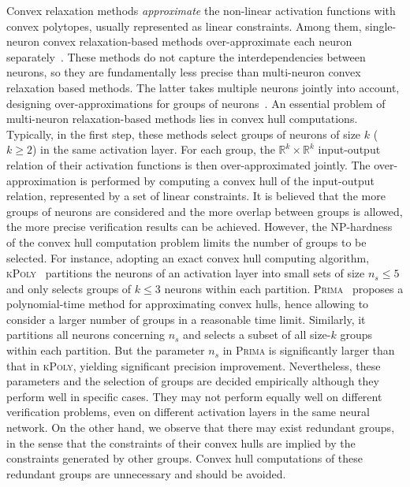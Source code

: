 \documentclass[runningheads]{llncs}
\newcommand{\prima}{\textsc{Prima}\xspace}
\newcommand{\krelu}{\textsc{kPoly}\xspace}
\newcommand{\real}{\mathbb{R}}
\begin{document}
Convex relaxation methods \emph{approximate} the non-linear activation functions
with convex polytopes, usually represented as linear constraints.
Among them, single-neuron convex relaxation-based methods over-approximate
each neuron separately~\cite{NEURIPS2018_f2f44698,DBLP:journals/pacmpl/SinghGPV19,DBLP:conf/nips/ZhangWCHD18,DBLP:conf/iclr/XuZ0WJLH21,Zheng2022}.
These methods do not capture the interdependencies between neurons,
so they are fundamentally less precise than multi-neuron convex relaxation
based methods.
The latter takes multiple neurons jointly into account,
designing over-approximations for groups of neurons~\cite{DBLP:conf/nips/SinghGPV19,DBLP:conf/nips/TjandraatmadjaA20,DBLP:journals/pacmpl/MullerMSPV22}.
An essential problem of multi-neuron relaxation-based methods lies in
convex hull computations. Typically, in the first step, these
methods select groups of neurons of size $k$ ($k\ge 2$) in the same
activation layer. For each group, the $\real^k\times \real^k$
input-output relation of their activation functions is then
over-approximated jointly. The over-approximation is performed by
computing a convex hull of the input-output relation, represented by a
set of linear constraints. It is believed that the more groups of
neurons are considered and the more overlap between groups is allowed,
the more precise verification results can be achieved. However, the
NP-hardness of the convex hull computation problem limits the number of
groups to be selected. For instance, adopting an exact convex hull
computing algorithm, \krelu~\cite{DBLP:conf/nips/SinghGPV19}
partitions the neurons of an activation layer into small sets of size
$n_s \le 5$ and only selects groups of $k\le 3$ neurons within each
partition. \prima~\cite{DBLP:journals/pacmpl/MullerMSPV22} proposes a
polynomial-time method for approximating convex hulls, hence allowing
to consider a larger number of groups in a reasonable time
limit. Similarly, it partitions all neurons concerning $n_s$ and
selects a subset of all size-$k$ groups within each partition. But the
parameter $n_s$ in \prima is significantly larger than that in \krelu,
yielding significant precision improvement. Nevertheless, these
parameters and the selection of groups are decided empirically 
although they perform well in specific cases. They
may not perform equally well on different verification problems, even
on different activation layers in the same neural network. On the
other hand, we observe that there may exist redundant groups, in the
sense that the constraints of their convex hulls are implied by the
constraints generated by other groups. Convex hull computations of
these redundant groups are unnecessary and should be avoided.
\end{document}
